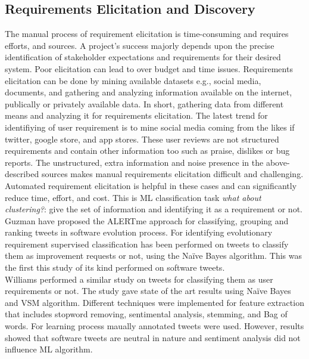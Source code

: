 
\subsection{Requirements Elicitation and Discovery}

The manual process of requirement elicitation is time-consuming and requires
efforts, and sources. A project's success majorly depends
upon the precise identification of stakeholder expectations and requirements for their desired
system. Poor elicitation can lead to over budget and time issues.
 Requirements elicitation can be done by mining
available datasets e.g., social media, documents, and gathering and analyzing information available on the internet,
publically or privately available data. In short, gathering data from different
means and analyzing it for requirements elicitation.  The latest trend for
identifiying of user requirement is to mine social media coming from the likes
if twitter, google store, and app stores. These user reviews are not
structured requirements and contain other information too such as praise,
dislikes or bug reports. The unstructured, extra information and noise
presence in the above-described sources makes manual requirements
elicitation difficult and challenging. Automated requirement elicitation
is helpful in these cases and can significantly reduce time, effort, and cost.
This is ML classification task \emph{what about clustering?}: give the set of
information and identifying it as a requirement or not.
\\

Guzman \etal \cite{Guzman:2017} have proposed the ALERTme approach for
classifying, grouping and ranking tweets in software evolution
process. For identifying evolutionary requirement supervised classification
has been performed on tweets to classify them as improvement requests or not,
using the Naïve Bayes algorithm. This was the first this study of its kind
performed on software tweets.\\

Williams \etal \cite{Williams:2017} performed a similar study on tweets for
classifying them as user requirements or not. The study gave state of the art
results using Naïve Bayes and VSM
algorithm.
Different techniques were implemented for feature extraction that includes stopword removing, sentimental analysis,
stemming, and Bag of words.
For learning process maually annotated tweets were used. However, results showed
that software tweets are neutral in nature and sentiment analysis did not
influence ML algorithm.\\

